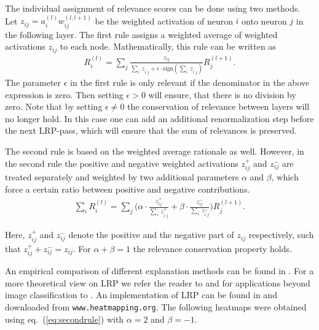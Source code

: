 \documentclass[runningheads]{llncs}
\begin{document}
The individual assignment of relevance scores can be done using two methods. Let  $z_{ij} = a_{i}^{(l)}w_{ij}^{(l,l+1)}$
 be the weighted activation of neuron $i$ onto neuron $j$ in the following layer. 
The first rule assigns a weighted average of weighted activations $z_{ij}$ to each node. Mathematically, this rule can be written as
\begin{align}
  R_{i}^{(l)} =  \sum_{j} \frac{
  	z_{ij}
  }
  {
  \sum_{i^{\prime}} z_{i^{\prime}j} + \epsilon \cdot \mathrm{sign}(\sum_{i^{\prime}} z_{i^{\prime}j})
  } R_{j}^{(l + 1)}.
  \label{eq:firstrule}
\end{align}
The parameter $\epsilon$ in the first rule is only relevant if the denominator in the above expression is zero. Then setting $\epsilon>0$ will ensure, that there is no division by zero. Note that by setting $\epsilon\neq0$ the conservation of relevance between layers will no longer hold. In this case one can add an additional renormalization step before the next LRP-pass, which will ensure that the sum of relevances is preserved.

The second rule is based on the weighted average rationale as well. However, in the second rule the positive and negative weighted activations $z_{ij}^{+}$ and $z_{ij}^{-}$ are treated separately and weighted by two additional parameters $\alpha$ and $\beta$, which force a certain ratio between positive and negative contributions.
\begin{align}
  \sum_{i} R_{i}^{(l)} = \sum_{j} \big(
   \alpha\cdot \frac{z^{+}_{ij}}{\sum_{i^{\prime}}z_{i^{\prime}j}^{+}} + 
   \beta \cdot \frac{z^{-}_{ij}}{\sum_{i^{\prime}}z_{i^{\prime}j}^{-}}   
  \big) R_{j}^{(l + 1)}.
    \label{eq:secondrule}
\end{align}

Here, $z_{ij}^{+}$ and $z_{ij}^{-}$ denote the positive and the negative part of $z_{ij}$ respectively, such that $z_{ij}^{+} + z_{ij}^{-}=z_{ij}$. For $\alpha+\beta=1$ the relevance conservation property holds.

An empirical comparison of different explanation methods can be found in \cite{samek2015evaluating}.
For a more theoretical view on LRP we refer the reader to \cite{MonArXiv15} and for applications beyond image classification to \cite{ArrACL16,StuArXiv16}.
An implementation of LRP can be found in \cite{LapJMLR16} and downloaded from \texttt{www.heatmapping.org}.
The following heatmaps were obtained using eq.~(\ref{eq:secondrule}) with $\alpha=2$ and $\beta=-1$.
\end{document}
